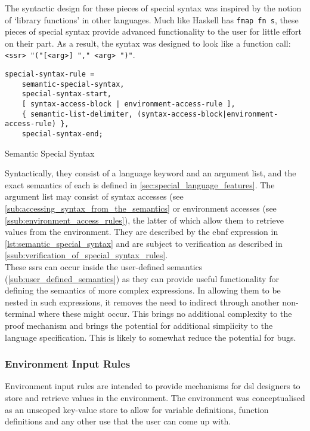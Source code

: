 The syntactic design for these pieces of special syntax was inspired by the notion of `library functions' in other languages.
Much like Haskell has \texttt{fmap fn s}, these pieces of special syntax provide advanced functionality to the user for little effort on their part.
As a result, the syntax was designed to look like a function call: \texttt{<ssr> "("[<arg>] {"," <arg>} ")"}.\\

\begin{listing}[!htb]
\begin{verbatim}
special-syntax-rule = 
    semantic-special-syntax,
    special-syntax-start,
    [ syntax-access-block | environment-access-rule ],
    { semantic-list-delimiter, (syntax-access-block|environment-access-rule) },
    special-syntax-end;
\end{verbatim}
\caption{Semantic Special Syntax}
\label{lst:semantic_special_syntax}
\end{listing}

Syntactically, they consist of a language keyword and an argument list, and the exact semantics of each is defined in \autoref{sec:special_language_features}.
The argument list may consist of syntax accesses (see \autoref{sub:accessing_syntax_from_the_semantics} or environment accesses (see \autoref{ssub:environment_access_rules}), the latter of which allow them to retrieve values from the environment.
They are described by the \gls{ebnf} expression in \autoref{lst:semantic_special_syntax} and are subject to verification as described in \autoref{ssub:verification_of_special_syntax_rules}.\\

These \glspl{ssr} can occur inside the user-defined semantics (\autoref{sub:user_defined_semantics}) as they can provide useful functionality for defining the semantics of more complex expressions.
In allowing them to be nested in such expressions, it removes the need to indirect through another non-terminal where these might occur. 
This brings no additional complexity to the proof mechanism and brings the potential for additional simplicity to the language specification.
This is likely to somewhat reduce the potential for bugs. 


\subsubsection{Environment Input Rules} %
\label{ssub:environment_input_rules}
Environment input rules are intended to provide mechanisms for \gls{dsl} designers to store and retrieve values in the environment. 
The environment was conceptualised as an unscoped key-value store to allow for variable definitions, function definitions and any other use that the user can come up with. \\

